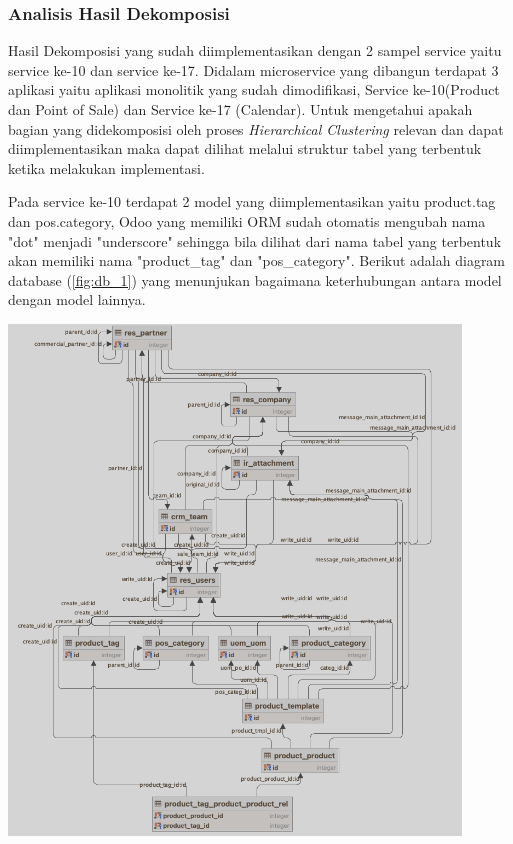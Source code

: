 

\subsubsection{Analisis Hasil Dekomposisi}
Hasil Dekomposisi yang sudah diimplementasikan dengan 2 sampel service yaitu service ke-10 dan service ke-17. Didalam microservice yang dibangun terdapat 3 aplikasi yaitu aplikasi monolitik yang sudah dimodifikasi, Service ke-10(Product dan Point of Sale) dan Service ke-17 (Calendar). Untuk mengetahui apakah bagian yang didekomposisi oleh proses \textit{Hierarchical Clustering} relevan dan dapat diimplementasikan maka dapat dilihat melalui struktur tabel yang terbentuk ketika melakukan implementasi.

Pada service ke-10 terdapat 2 model yang diimplementasikan yaitu product.tag dan pos.category, Odoo yang memiliki ORM sudah otomatis mengubah nama "dot" menjadi "underscore" sehingga bila dilihat dari nama tabel yang terbentuk akan memiliki nama "product\_tag" dan "pos\_category". Berikut adalah diagram database (\ref{fig:db_1})  yang menunjukan bagaimana keterhubungan antara model dengan model lainnya. 

\begin{center}
	\includegraphics[width=12cm]{img/bab_4/db_1.png}
	\label{fig:db_1}
\end{center}

